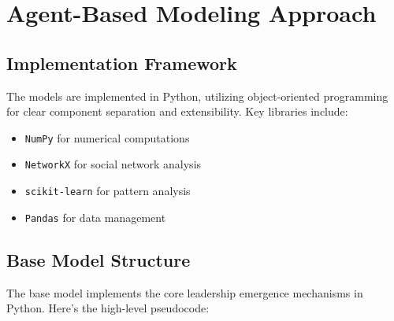 \documentclass[12pt]{article}
\begin{document}
\section{Agent-Based Modeling Approach}

\subsection{Implementation Framework}
The models are implemented in Python, utilizing object-oriented programming for clear component separation and extensibility. Key libraries include:

\begin{itemize}
    \item \texttt{NumPy} for numerical computations
    \item \texttt{NetworkX} for social network analysis
    \item \texttt{scikit-learn} for pattern analysis
    \item \texttt{Pandas} for data management
\end{itemize}

\subsection{Base Model Structure}
The base model implements the core leadership emergence mechanisms in Python. Here's the high-level pseudocode:
\end{document}
